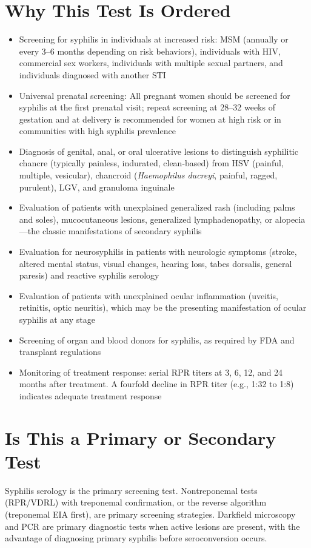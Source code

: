 \section*{Why This Test Is Ordered}
\begin{itemize}
  \item Screening for syphilis in individuals at increased risk: MSM (annually or every 3--6 months depending on risk behaviors), individuals with HIV, commercial sex workers, individuals with multiple sexual partners, and individuals diagnosed with another STI
  \item Universal prenatal screening: All pregnant women should be screened for syphilis at the first prenatal visit; repeat screening at 28--32 weeks of gestation and at delivery is recommended for women at high risk or in communities with high syphilis prevalence
  \item Diagnosis of genital, anal, or oral ulcerative lesions to distinguish syphilitic chancre (typically painless, indurated, clean-based) from HSV (painful, multiple, vesicular), chancroid (\textit{Haemophilus ducreyi}, painful, ragged, purulent), LGV, and granuloma inguinale
  \item Evaluation of patients with unexplained generalized rash (including palms and soles), mucocutaneous lesions, generalized lymphadenopathy, or alopecia---the classic manifestations of secondary syphilis
  \item Evaluation for neurosyphilis in patients with neurologic symptoms (stroke, altered mental status, visual changes, hearing loss, tabes dorsalis, general paresis) and reactive syphilis serology
  \item Evaluation of patients with unexplained ocular inflammation (uveitis, retinitis, optic neuritis), which may be the presenting manifestation of ocular syphilis at any stage
  \item Screening of organ and blood donors for syphilis, as required by FDA and transplant regulations
  \item Monitoring of treatment response: serial RPR titers at 3, 6, 12, and 24 months after treatment. A fourfold decline in RPR titer (e.g., 1:32 to 1:8) indicates adequate treatment response
\end{itemize}

\section*{Is This a Primary or Secondary Test}
Syphilis serology is the primary screening test. Nontreponemal tests (RPR/VDRL) with treponemal confirmation, or the reverse algorithm (treponemal EIA first), are primary screening strategies. Darkfield microscopy and PCR are primary diagnostic tests when active lesions are present, with the advantage of diagnosing primary syphilis before seroconversion occurs.

